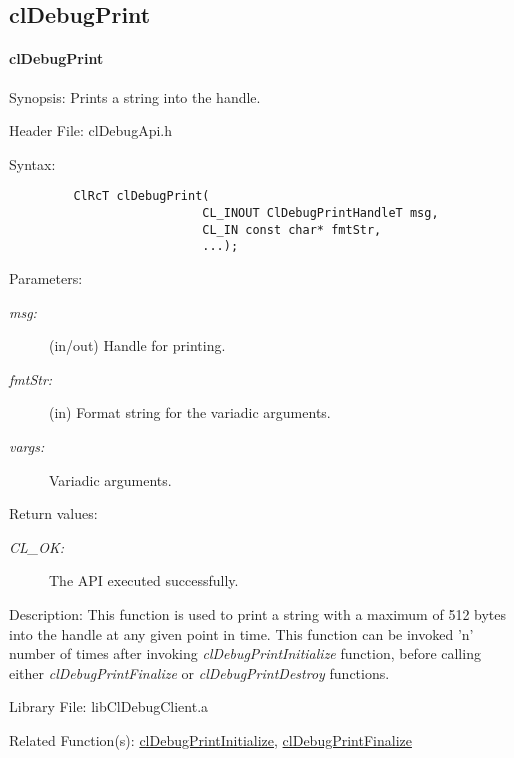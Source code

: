 \subsection{clDebugPrint}
\hypertarget{pagedbg107}{}\paragraph{cl\-Debug\-Print}\label{pagedbg107}
\begin{Desc}
\item[Synopsis:]Prints a string into the handle.\end{Desc}
\begin{Desc}
\item[Header File:]clDebugApi.h\end{Desc}
\begin{Desc}
\item[Syntax:]

\footnotesize\begin{verbatim}         ClRcT clDebugPrint(
                           CL_INOUT ClDebugPrintHandleT msg,
                           CL_IN const char* fmtStr,
                           ...);
\end{verbatim}
\normalsize
\end{Desc}
\begin{Desc}
\item[Parameters:]
\begin{description}
\item[{\em msg:}](in/out) Handle for printing. \item[{\em fmt\-Str:}](in) Format string for the variadic arguments. \item[{\em vargs:}]Variadic arguments.\end{description}
\end{Desc}
\begin{Desc}
\item[Return values:]
\begin{description}
\item[{\em CL\_\-OK:}]The API executed successfully.\end{description}
\end{Desc}
\begin{Desc}
\item[Description:]This function is used to print a string with a maximum of 512 bytes into the handle at any given point in time. This function can be invoked 'n' number of times after invoking {\em cl\-Debug\-Print\-Initialize\/} function, before calling either {\em cl\-Debug\-Print\-Finalize\/} or {\em cl\-Debug\-Print\-Destroy\/} functions.\end{Desc}
\begin{Desc}
\item[Library File:]lib\-Cl\-Debug\-Client.a\end{Desc}
\begin{Desc}
\item[Related Function(s):]\hyperlink{pagedbg106}{cl\-Debug\-Print\-Initialize}, \hyperlink{pagedbg108}{cl\-Debug\-Print\-Finalize} \end{Desc}
\newpage


